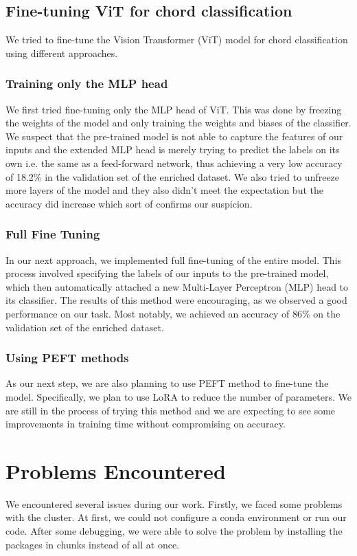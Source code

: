 \documentclass[10pt,twocolumn,letterpaper]{article}
\begin{document}
\subsection{Fine-tuning ViT for chord classification}
We tried to fine-tune the Vision Transformer (ViT) model for chord classification using different approaches.

\subsubsection{Training only the MLP head}
We first tried fine-tuning only the MLP head of ViT. This was done by freezing the weights of the model and only training the weights and biases of the classifier. We suspect that the pre-trained model is not able to capture the features of our inputs and the extended MLP head is merely trying to predict the labels on its own i.e. the same as a feed-forward network, thus achieving a very low accuracy of 18.2\% in the validation set of the enriched dataset. We also tried to unfreeze more layers of the model and they also didn't meet the expectation but the accuracy did increase which sort of confirms our suspicion.

\subsubsection{Full Fine Tuning}
In our next approach, we implemented full fine-tuning of the entire model. This process involved specifying the labels of our inputs to the pre-trained model, which then automatically attached a new Multi-Layer Perceptron (MLP) head to its classifier. The results of this method were encouraging, as we observed a good performance on our task. Most notably, we achieved an accuracy of 86\% on the validation set of the enriched dataset.

\subsubsection{Using PEFT methods}
As our next step, we are also planning to use PEFT \cite{peft} method to fine-tune the model. Specifically, we plan to use LoRA to reduce the number of parameters. We are still in the process of trying this method and we are expecting to see some improvements in training time without compromising on accuracy.

\section{Problems Encountered}
We encountered several issues during our work. Firstly, we faced some problems with the cluster. At first, we could not configure a conda environment or run our code. After some debugging, we were able to solve the problem by installing the packages in chunks instead of all at once.
\end{document}
